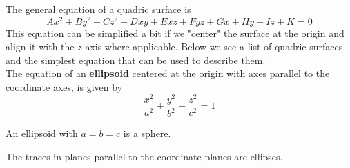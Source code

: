 \documentclass[handout]{ximera}
\begin{document}
\begin{image}
\end{image}


\begin{image}
\end{image}

\begin{image}
\end{image}


The general equation of a quadric surface is 
\[
Ax^2 + By^2 + Cz^2 + Dxy + Exz + Fyz + Gx + Hy + Iz + K = 0
\]
This equation can be simplified a bit if we "center" the surface at the origin and 
align it with the $z$-axis where applicable. 
Below we see a list of quadric surfaces and the simplest equation that can be used to describe them.\\

The equation of an \textbf{ellipsoid} centered at the origin with axes parallel to the coordinate axes, is given by 
\[
\frac{x^2}{a^2} + \frac{y^2}{b^2}+ \frac{z^2}{c^2} = 1
\]
\begin{remark}
An ellipsoid with $ a=b=c$ is a sphere.
\end{remark}

The traces in planes parallel to the coordinate planes are ellipses.
\end{document}
